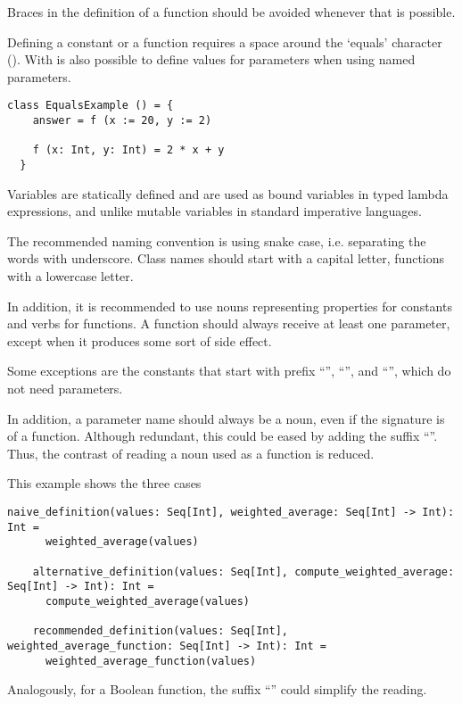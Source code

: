 Braces in the definition of a function should be avoided whenever that is possible.

Defining a constant or a function requires a space around the `equals' character (\sodadef).
With \sodadefparam is also possible to define values for parameters when using named parameters.

\begin{lstlisting}[label={lst:exampleFunctionWithoutBraces}]
  class EqualsExample () = {
    answer = f (x := 20, y := 2)

    f (x: Int, y: Int) = 2 * x + y
  }
\end{lstlisting}


Variables are statically defined and are used as bound variables in typed lambda expressions, and unlike mutable variables in standard imperative languages.

The recommended naming convention is using snake case, i.e. separating the words with underscore.
Class names should start with a capital letter, functions with a lowercase letter.

In addition, it is recommended to use nouns representing properties for constants and verbs for functions.
A function should always receive at least one parameter, except when it produces some sort of side effect.

Some exceptions are the constants that start with prefix ``'', ``'', and ``'', which do not need parameters.

In addition, a parameter name should always be a noun, even if the signature is of a function.
Although redundant, this could be eased by adding the suffix ``''.
Thus, the contrast of reading a noun used as a function is reduced.

This example shows the three cases

\begin{lstlisting}[label={lst:exampleFunctionsAsParameter}]
    naive_definition(values: Seq[Int], weighted_average: Seq[Int] -> Int): Int =
      weighted_average(values)

    alternative_definition(values: Seq[Int], compute_weighted_average: Seq[Int] -> Int): Int =
      compute_weighted_average(values)

    recommended_definition(values: Seq[Int], weighted_average_function: Seq[Int] -> Int): Int =
      weighted_average_function(values)
\end{lstlisting}

Analogously, for a Boolean function, the suffix ``'' could simplify the reading.

